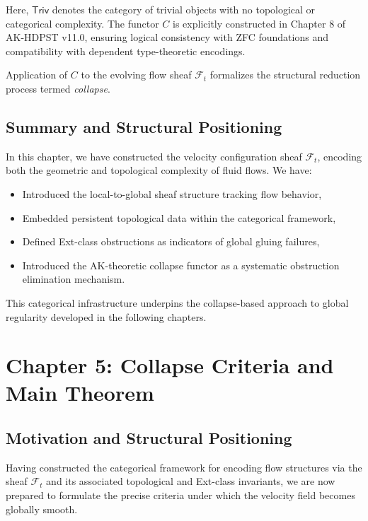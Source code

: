 \documentclass[11pt]{article}
\begin{document}
Here, \( \mathsf{Triv} \) denotes the category of trivial objects with no topological or categorical complexity. The functor \( C \) is explicitly constructed in Chapter 8 of AK-HDPST v11.0, ensuring logical consistency with ZFC foundations and compatibility with dependent type-theoretic encodings.

Application of \( C \) to the evolving flow sheaf \( \mathcal{F}_t \) formalizes the structural reduction process termed \emph{collapse}.

\subsection{Summary and Structural Positioning}

In this chapter, we have constructed the velocity configuration sheaf \( \mathcal{F}_t \), encoding both the geometric and topological complexity of fluid flows. We have:

\begin{itemize}
  \item Introduced the local-to-global sheaf structure tracking flow behavior,
  \item Embedded persistent topological data within the categorical framework,
  \item Defined Ext-class obstructions as indicators of global gluing failures,
  \item Introduced the AK-theoretic collapse functor as a systematic obstruction elimination mechanism.
\end{itemize}

This categorical infrastructure underpins the collapse-based approach to global regularity developed in the following chapters.



\section{Chapter 5: Collapse Criteria and Main Theorem}

\subsection{Motivation and Structural Positioning}

Having constructed the categorical framework for encoding flow structures via the sheaf \( \mathcal{F}_t \) and its associated topological and Ext-class invariants, we are now prepared to formulate the precise criteria under which the velocity field becomes globally smooth.
\end{document}
